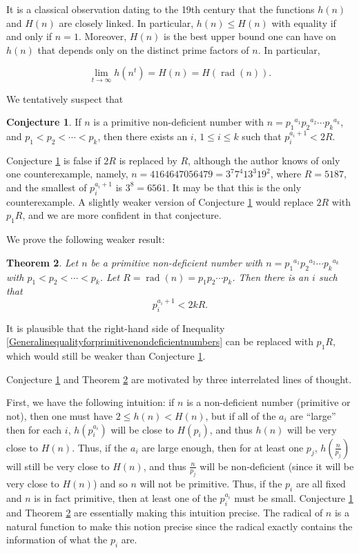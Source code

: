 \documentclass[12pt,reqno]{article}
\theoremstyle{plain}
\newtheorem{theorem}{Theorem}
\theoremstyle{definition}
\newtheorem{conjecture}[theorem]{Conjecture}
\theoremstyle{remark}
\DeclareMathOperator{\rad}{rad}
\begin{document}
It is a classical observation dating to the 19th century that the functions $h(n)$ and $H(n)$ are closely linked. In particular, $h(n) \leq H(n)$ with equality if and only if $n=1$. Moreover, $H(n)$ is the best upper bound one can have on $h(n)$ that depends only on the distinct prime factors of $n$. In particular,

$$\lim_{t \rightarrow \infty} h(n^t) = H(n) = H(\rad(n)).$$

We tentatively suspect that

\begin{conjecture}\label{mainconjecture} If $n$ is a primitive non-deficient number with $n={p_1}^{a_1}{p_2}^{a_2} \cdots {p_k}^{a_k}$, 
and $p_1 < p_2 < \cdots < p_k$,
then there exists an $i$, $1 \leq i \leq k$ such that $p_i^{a_i+1} < 2R$.
\end{conjecture}

Conjecture \ref{mainconjecture} is false if $2R$ is replaced by $R$, although the author knows of only one counterexample, namely, $n=4164647056479 =  3^7 7^4  13^3  19^2 $, where  $R=5187$, and the smallest of $p_i^{a_i+1}$ is $3^8=6561$. It may be that this is the only counterexample. A slightly weaker version of Conjecture \ref{mainconjecture} would replace $2R$ with $p_1R$, and we are more confident in that conjecture. 

We prove the following weaker result:

\begin{theorem} Let $n$ be a primitive non-deficient number with $n={p_1}^{a_1}{p_2}^{a_2} \cdots {p_k}^{a_k}$ with $p_1 < p_2 < \cdots < p_k$. Let $R=\rad(n) = p_1p_2\cdots p_k$. Then there is an $i$ such that \label{maintheoremboundwithkR}
\begin{equation}\label{Generalinequalityforprimitivenondeficientnumbers}p_i^{a_i+1} < 2kR.\end{equation}
\end{theorem}

It is plausible that the right-hand side of Inequality \eqref{Generalinequalityforprimitivenondeficientnumbers} can be replaced with $p_1R$, which would still be weaker than Conjecture \ref{mainconjecture}.

Conjecture \ref{mainconjecture} and Theorem \ref{maintheoremboundwithkR} are motivated by three interrelated lines of thought. 

First, we have the following intuition: if $n$ is a non-deficient number (primitive or not), then one must have $2 \leq h(n) < H(n)$, but if all of the $a_i$ are ``large'' then for each $i$, $h(p_i^{a_i})$ will be close to $H(p_i)$, and thus $h(n)$ will be very close to $H(n)$. Thus, if the $a_i$ are large enough, then for at least one $p_j$, $h(\frac{n}{p_j})$ will still be very close to $H(n)$, and thus $\frac{n}{p_j}$ will be non-deficient (since it will be very close to $H(n)$) and so $n$ will not be primitive. Thus, if the $p_i$ are all fixed and $n$ is in fact primitive, then at least one of the $p_i^{a_i}$ must be small. Conjecture \ref{mainconjecture} and Theorem \ref{maintheoremboundwithkR} are essentially making this intuition precise. The radical of $n$ is a natural function to make this notion precise since the radical exactly contains the information of what the $p_i$ are.  
\end{document}
